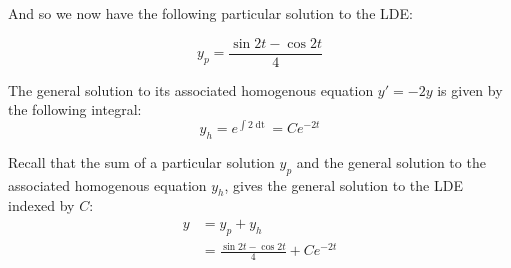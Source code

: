 \documentclass{article}
\begin{document}
And so we now have the following particular solution to the LDE:

\begin{equation*}
    y_p=\frac{\sin 2t -\cos 2t}{4}
\end{equation*}

The general solution to its associated homogenous equation $y'=-2y$ is given by the following integral:
\begin{equation*}
    y_h=e^{\int2\mathop{dt}}=Ce^{-2t}
\end{equation*}
\smallskip

Recall that the sum of a particular solution $y_p$ and the general solution to the associated homogenous equation $y_h$, gives the general solution to the LDE indexed by $C$:
\begin{align*}
    y&=y_p+y_h\\
    &=\frac{\sin 2t -\cos 2t}{4}+Ce^{-2t}
\end{align*}
\smallskip




\end{document}

